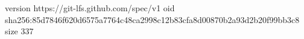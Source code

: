 version https://git-lfs.github.com/spec/v1
oid sha256:85d7846f620d6575a7764c48ca2998c12b83cfa8d00870b2a93d2b20f99bb3c8
size 337
